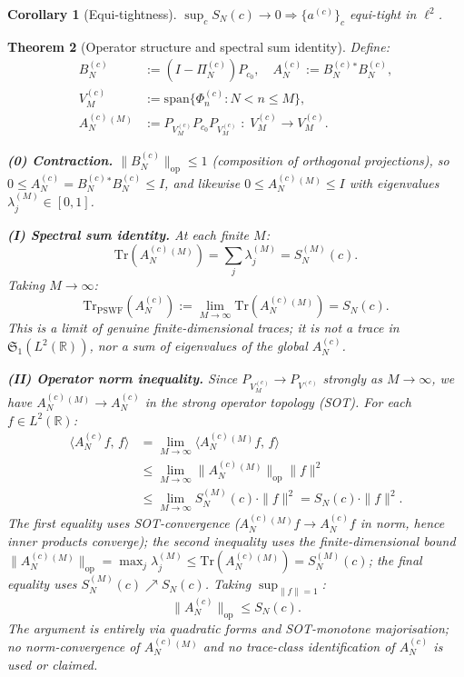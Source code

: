 \documentclass[12pt,a4paper]{amsart}
\newtheorem{theorem}{Theorem}[section]
\newtheorem{corollary}[theorem]{Corollary}
\theoremstyle{definition}
\theoremstyle{remark}
\newcommand{\norm}[1]{\|#1\|}
\newcommand{\ip}[2]{\langle #1,\, #2\rangle}
\newcommand{\Phic}[2]{\Phi_{#2}^{(#1)}}
\newcommand{\Pc}{P_{c_0}}
\newcommand{\Bn}{B_N^{(c)}}
\newcommand{\Ac}{A_N^{(c)}}
\begin{document}
\begin{corollary}[Equi-tightness]
$\sup_c S_N(c)\to 0
\Rightarrow\{a^{(c)}\}_c$
equi-tight in $\ell^2$.
\end{corollary}

\begin{theorem}[Operator structure and
  spectral sum identity]
\label{thm:SN-operator}
Define:
\begin{align*}
  \Bn &:= (I-\Pi_N^{(c)})\Pc,\quad
  \Ac := \Bn^*\Bn,\\
  V_M^{(c)} &:= \mathrm{span}
    \{\Phic{c}{n} : N < n \le M\},\\
  \Ac^{(M)} &:= P_{V_M^{(c)}}P_{c_0}P_{V_M^{(c)}}
    \;:\; V_M^{(c)}\to V_M^{(c)}.
\end{align*}

\textbf{(0) Contraction.}
$\norm{\Bn}_{\mathrm{op}}\le 1$ (composition
of orthogonal projections), so
$0\le\Ac=\Bn^*\Bn\le I$,
and likewise $0\le\Ac^{(M)}\le I$
with eigenvalues $\lambda_j^{(M)}\in[0,1]$.

\medskip
\textbf{(I) Spectral sum identity.}
At each finite $M$:
\begin{equation}\label{eq:trace-M}
  \mathrm{Tr}(\Ac^{(M)})
  = \sum_{j}\lambda_j^{(M)}
  = S_N^{(M)}(c).
\end{equation}
Taking $M\to\infty$:
\begin{equation}\label{eq:TrPSWF}
  \mathrm{Tr}_{\mathrm{PSWF}}(\Ac)
  := \lim_{M\to\infty}\mathrm{Tr}(\Ac^{(M)})
  = S_N(c).
\end{equation}
This is a limit of genuine finite-dimensional
traces; it is \emph{not} a trace in
$\mathfrak{S}_1(L^2(\mathbb{R}))$,
nor a sum of eigenvalues of the global $\Ac$.

\medskip
\textbf{(II) Operator norm inequality.}
Since $P_{V_M^{(c)}}\to P_{V^{(c)}}$
strongly as $M\to\infty$,
we have $\Ac^{(M)}\to\Ac$ in the strong
operator topology (SOT).
For each $f\in L^2(\mathbb{R})$:
\begin{align}
  \ip{\Ac f}{f}
  &= \lim_{M\to\infty}
     \ip{\Ac^{(M)} f}{f}
  \nonumber\\
  &\le \lim_{M\to\infty}
     \norm{\Ac^{(M)}}_{\mathrm{op}}
     \norm{f}^2
  \nonumber\\
  &\le \lim_{M\to\infty}
     S_N^{(M)}(c)\cdot\norm{f}^2
  = S_N(c)\cdot\norm{f}^2.
  \label{eq:qf-bound}
\end{align}
The first equality uses SOT-convergence
($\Ac^{(M)}f\to\Ac f$ in norm,
hence inner products converge);
the second inequality uses the
finite-dimensional bound
$\norm{\Ac^{(M)}}_{\mathrm{op}}
=\max_j\lambda_j^{(M)}
\le\mathrm{Tr}(\Ac^{(M)})=S_N^{(M)}(c)$;
the final equality uses
$S_N^{(M)}(c)\nearrow S_N(c)$.
Taking $\sup_{\norm{f}=1}$:
\begin{equation}\label{eq:op-le-spectral}
  \norm{\Ac}_{\mathrm{op}}
  \le S_N(c).
\end{equation}
The argument is entirely via quadratic
forms and SOT-monotone majorisation;
no norm-convergence of $\Ac^{(M)}$
and no trace-class identification
of $\Ac$ is used or claimed.


\end{theorem}
\end{document}
